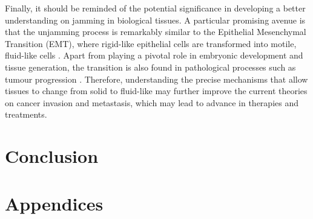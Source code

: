 \documentclass[a4paper,12pt]{article}
\begin{document}
Finally, it should be reminded of the potential significance in developing a better understanding on jamming in biological tissues. A particular promising avenue is that the unjamming process is remarkably similar to the Epithelial Mesenchymal Transition (EMT), where rigid-like epithelial cells are transformed into motile, fluid-like cells \cite{kalluri2009}. Apart from playing a pivotal role in embryonic development and tissue generation, the transition is also found in pathological processes such as tumour progression \cite{thiery2002}. Therefore, understanding the precise mechanisms that allow tissues to change from solid to fluid-like may further improve the current theories on cancer invasion and metastasis, which may lead to advance in therapies and treatments. 


\section{Conclusion}


   


\appendix
\section{Appendices}
\end{document}
